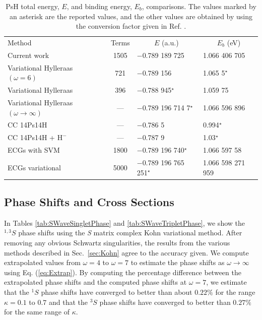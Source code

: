 \documentclass[preprint,showpacs,showkeys,preprintnumbers,amsmath,amssymb,longbibliography,pra,aps]{revtex4-1}
\newcommand*{\thead}[1]{\multicolumn{1}{c}{#1}}
\begin{document}
\squeezetable  %
\begin{table}
\begin{center}
\begin{ruledtabular}  %
\begin{tabular}{l c l l}
Method & Terms & \thead{$E$ (a.u.)} & \thead{$E_b$ (eV)}\\
\colrule
Current work & 1505 & $-$0.789 189 725 & 1.066 406 705 \\
Variational Hylleraas $(\omega = 6)$ \cite{VanReeth2003} & 721 & $-$0.789 156 & 1.065 5$^\star$ \\
Variational Hylleraas \cite{Ho1986} & 396 & $-$0.788 945$^\star$ & 1.059 75 \\
Variational Hylleraas $(\omega \rightarrow \infty)$ \cite{Yan1999} & --- & $-$0.789 196 714 7$^\star$ & 1.066 596 896 \\
CC 14Ps14H \cite{Blackwood2002} & --- & $-$0.786 5 & 0.994$^\star$ \\
CC 14Ps14H + $\text{H}^-$ \cite{Walters2004} & --- & $-$0.787 9 & 1.03$^\star$\\
ECGs with SVM \cite{Mitroy2006} & 1800 & $-$0.789 196 740$^\star$ & 1.066 597 58 \\
ECGs variational \cite{Bubin2006} & 5000 & $-$0.789 196 765 251$^\star$ & 1.066 598 271 959 \\
\end{tabular}
\end{ruledtabular}
\caption{PsH total energy, $E$, and binding energy, $E_b$, comparisons.
The values marked by an asterisk are the
reported values, and the other values are obtained by using the conversion
factor given in Ref. \cite{Mohr2012,*NISTConversions}.}
\label{tab:BoundEnergy}
\end{center}
\end{table}

\subsection{Phase Shifts and Cross Sections}
\label{sec:PhaseCross}

In Tables \ref{tab:SWaveSingletPhase} and \ref{tab:SWaveTripletPhase}, we 
show the $^{1,3}S$ phase shifts using the \emph{S} matrix complex Kohn 
variational method. After removing any obvious Schwartz singularities, the
results from the various methods described in Sec.~\ref{sec:Kohn} agree
to the accuracy given. We compute extrapolated values from $\omega = 4$ to
$\omega = 7$
to estimate the phase shifts as $\omega \rightarrow \infty$ using Eq.
(\ref{eq:Extrap}). By computing the percentage difference between the
extrapolated phase shifts and the computed phase shifts at $\omega=7$, we
estimate that the $^1S$ phase shifts have converged to better than about
$0.22\%$ for the range $\kappa=0.1$ to $0.7$ and that the $^3S$ phase shifts
have converged to better than $0.27\%$ for the same range of $\kappa$.
\end{document}
